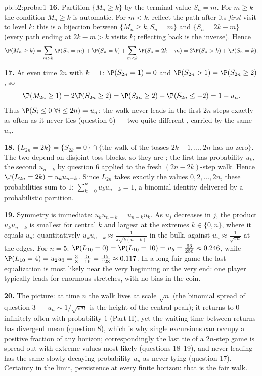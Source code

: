 \begin{solution}{pb:b2:proba:1}
\textbf{16.} Partition $\{M_n \geq k\}$ by the terminal value
$S_n = m$. For $m \geq k$ the condition $M_n \geq k$ is
automatic. For $m < k$, reflect the path after its
\emph{first} visit to level $k$: this is a bijection between
$\{M_n \geq k, S_n = m\}$ and $\{S_n = 2k - m\}$ (every path
ending at $2k - m > k$ visits $k$; reflecting back is the
inverse). Hence
\[
\P(M_n \geq k)
= \sum_{m > k}\P(S_n = m) + \P(S_n = k)
+ \sum_{m < k}\P(S_n = 2k - m)
= 2\P(S_n > k) + \P(S_n = k).
\]

\textbf{17.} At even time $2n$ with $k = 1$: $\P(S_{2n} = 1)
= 0$ and $\P(S_{2n} > 1) = \P(S_{2n} \geq 2)$, so
\[
\P(M_{2n} \geq 1) = 2\P(S_{2n} \geq 2)
= \P(S_{2n} \geq 2) + \P(S_{2n} \leq -2)
= 1 - u_n .
\]
Thus $\P(S_i \leq 0\ \forall i \leq 2n) = u_n$: the walk
never leads in the first $2n$ steps exactly as often as it
never ties (question 6) --- two quite different ,
carried by the same $u_n$.

\textbf{18.} $\{L_{2n} = 2k\} = \{S_{2k} = 0\} \cap
\{\text{the walk of the tosses } 2k+1, \dots, 2n \text{ has
no zero}\}$. The two  depend on disjoint toss blocks,
so they are ; the first has probability $u_k$, the
second $u_{n-k}$ by question 6 applied to the fresh
$(2n-2k)$-step walk. Hence $\P(L_{2n} = 2k) = u_ku_{n-k}$.
Since $L_{2n}$ takes exactly the values $0, 2, \dots, 2n$,
these probabilities sum to $1$:
$\sum_{k=0}^nu_ku_{n-k} = 1$, a binomial identity delivered
by a probabilistic partition.

\textbf{19.} Symmetry is immediate: $u_ku_{n-k} =
u_{n-k}u_k$. As $u_j$ decreases in $j$, the product
$u_ku_{n-k}$ is smallest for central $k$ and largest at the
extremes $k \in \{0, n\}$, where it equals $u_n$;
quantitatively $u_ku_{n-k} \approx \frac1{\pi\sqrt{k(n-k)}}$
in the bulk, against $u_n \approx \frac1{\sqrt{\pi n}}$ at
the edges. For $n = 5$: $\P(L_{10} = 0) = \P(L_{10} = 10) =
u_5 = \frac{63}{256} \approx 0.246$, while $\P(L_{10} = 4) =
u_2u_3 = \frac38\cdot\frac5{16} = \frac{15}{128} \approx
0.117$. In a long fair game the last equalization is most
likely near the very beginning or the very end: one player
typically leads for enormous stretches, with no bias in the
coin.

\textbf{20.} The picture: at time $n$ the walk lives at scale
$\sqrt n$ (the binomial spread of question 3 --- $u_n \sim
1/\sqrt{\pi n}$ is the height of the central peak); it
returns to $0$ infinitely often with probability $1$ (Part
II), yet the waiting time between returns has divergent mean
(question 8), which is why single excursions can occupy a
positive fraction of any horizon; correspondingly the last
tie of a $2n$-step game is spread out with extreme values
most likely (questions 18--19), and never-leading has the
same slowly decaying probability $u_n$ as never-tying
(question 17). Certainty in the limit, persistence at every
finite horizon: that is the fair walk.


\end{solution}
